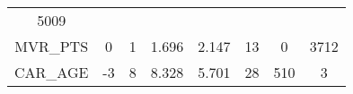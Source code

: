 \documentclass[]{article}
\begin{document}
\begin{longtable}[]{@{}cccccccc@{}}
\begin{minipage}[t]{0.14\columnwidth}
5009\strut
\end{minipage}\tabularnewline
\begin{minipage}[t]{0.11\columnwidth}\centering\strut
MVR\_PTS\strut
\end{minipage} & \begin{minipage}[t]{0.07\columnwidth}\centering\strut
0\strut
\end{minipage} & \begin{minipage}[t]{0.09\columnwidth}\centering\strut
1\strut
\end{minipage} & \begin{minipage}[t]{0.09\columnwidth}\centering\strut
1.696\strut
\end{minipage} & \begin{minipage}[t]{0.09\columnwidth}\centering\strut
2.147\strut
\end{minipage} & \begin{minipage}[t]{0.09\columnwidth}\centering\strut
13\strut
\end{minipage} & \begin{minipage}[t]{0.13\columnwidth}\centering\strut
0\strut
\end{minipage} & \begin{minipage}[t]{0.14\columnwidth}\centering\strut
3712\strut
\end{minipage}\tabularnewline
\begin{minipage}[t]{0.11\columnwidth}\centering\strut
CAR\_AGE\strut
\end{minipage} & \begin{minipage}[t]{0.07\columnwidth}\centering\strut
-3\strut
\end{minipage} & \begin{minipage}[t]{0.09\columnwidth}\centering\strut
8\strut
\end{minipage} & \begin{minipage}[t]{0.09\columnwidth}\centering\strut
8.328\strut
\end{minipage} & \begin{minipage}[t]{0.09\columnwidth}\centering\strut
5.701\strut
\end{minipage} & \begin{minipage}[t]{0.09\columnwidth}\centering\strut
28\strut
\end{minipage} & \begin{minipage}[t]{0.13\columnwidth}\centering\strut
510\strut
\end{minipage} & \begin{minipage}[t]{0.14\columnwidth}\centering\strut
3\strut
\end{minipage}\tabularnewline
\bottomrule
\end{longtable}
\end{document}
